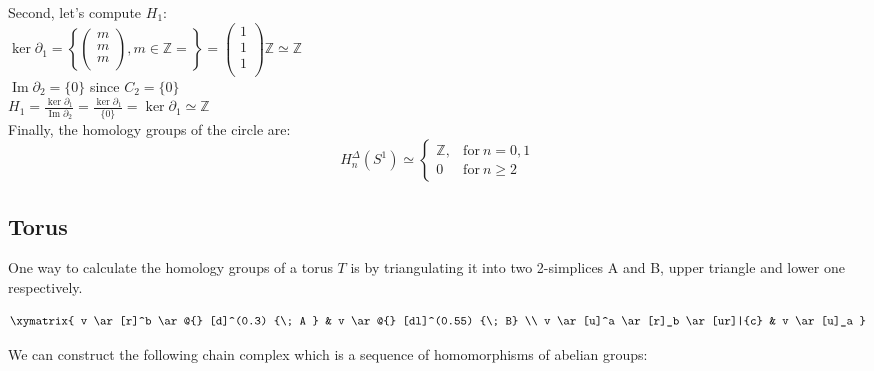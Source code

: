\documentclass[11pt,a4paper]{report}
\DeclareMathOperator{\Ima}{Im}
\begin{document}
\par
Second, let's compute $H_1$: \\
$\ker\partial_1 = \left\{ \left(\begin{array}{c}
                    m\\
                    m\\
                    m\\
            \end{array} \right), m \in \mathbb{Z} = \right\} = \left(\begin{array}{c}
                    1\\
                    1\\
                    1\\
            \end{array} \right) \mathbb{Z} \simeq \mathbb{Z}$ \\ 
$\Ima\partial_2 = \{0\}$ since $C_2 = \{0\}$ \\
$H_1 = \frac{\ker\partial_1}{\Ima\partial_2} = 
		\frac{ \ker{\partial_1} }{ \{0\} } = \ker{\partial_1} \simeq \mathbb{Z}$ \\


Finally, the homology groups of the circle are: 
		\[
	  		H_n^\Delta(S^1) \simeq \left\{
			      \begin{array}{rl}
			     \mathbb{Z}, & \textrm{for} \: n = 0, 1\\
			    
                        0 & \textrm{for} \: n \geqslant 2
			      \end{array}
			 \right.
	  	\]


               
		      \subsection{Torus}
      
One way to calculate the homology groups of a torus $T$ is by triangulating it into two 2-simplices A and B, upper triangle and lower one respectively.

	\[
		\xymatrix{
			v  \ar[r]^b \ar @{} [d]^(0.3) {\; A }
			& v \ar @{} [dl]^(0.55) {\; B} \\
			v \ar[u]^a \ar[r]_b \ar[ur]|{c}
			& v \ar[u]_a }
	\]
                                                                       
 We can construct the following chain complex which is a sequence of homomorphisms of abelian groups: 
\end{document}
